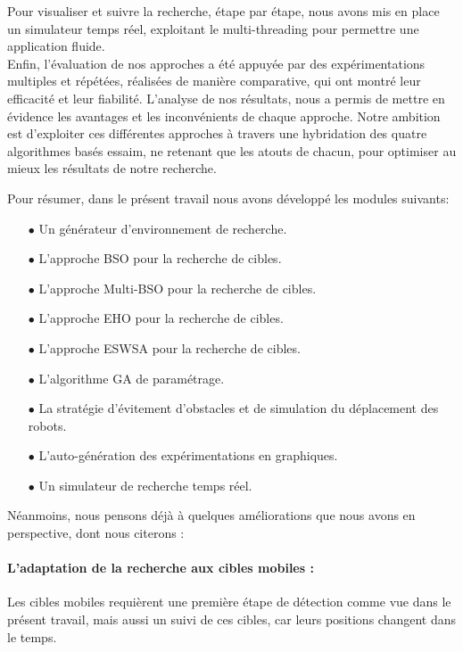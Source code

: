 Pour visualiser et suivre la recherche, étape par étape, nous avons mis en place un simulateur temps réel, exploitant le multi-threading pour permettre une application fluide.\\

Enfin, l'évaluation de nos approches a été appuyée par des expérimentations multiples et répétées, réalisées de manière comparative, qui ont montré leur efficacité et leur fiabilité. L'analyse de nos résultats, nous a permis de mettre en évidence les avantages et les inconvénients de chaque approche. Notre ambition est d'exploiter ces différentes approches à travers une hybridation des quatre algorithmes basés essaim, ne retenant que les atouts de chacun, pour optimiser au mieux les résultats de notre recherche.

Pour résumer, dans le présent travail nous avons développé les modules suivants:
\begin{itemize}
	\item[$\bullet$] Un générateur d'environnement de recherche.
	\item[$\bullet$] L'approche BSO pour la recherche de cibles. 
	\item[$\bullet$] L'approche Multi-BSO pour la recherche de cibles. 
	\item[$\bullet$] L'approche EHO pour la recherche de cibles.
	
	\item[$\bullet$] L'approche ESWSA pour la recherche de cibles.
	\item[$\bullet$] L'algorithme GA de paramétrage.
	
	\item[$\bullet$] La stratégie d'évitement d'obstacles et de simulation du déplacement des robots. 
	
	\item[$\bullet$] L'auto-génération des expérimentations en graphiques.
	
	\item[$\bullet$] Un simulateur de recherche temps réel.\\
	
\end{itemize}


Néanmoins, nous pensons déjà à quelques améliorations que nous avons en perspective, dont nous citerons :

	
\paragraph{L'adaptation de la recherche aux cibles mobiles :}
Les cibles mobiles requièrent une première étape de détection comme vue dans le présent travail, mais aussi un suivi de ces cibles, car leurs positions changent dans le temps.

